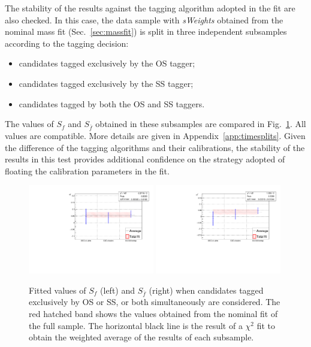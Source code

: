 The stability of the results against the tagging algorithm adopted in the fit are also checked. In this case, the data
sample with \emph{sWeights} obtained from the nominal mass fit (Sec.~\ref{sec:massfit}) is split in three independent subsamples
according to the tagging decision:
\begin{itemize}[noitemsep,topsep=0pt]
  \item candidates tagged exclusively by the OS tagger;
  \item candidates tagged exclusively by the SS tagger;
  \item candidates tagged by both the OS and SS taggers.
\end{itemize}
The values of $S_{f}$ and  $S_{\bar{f}}$ obtained in these subsamples are compared in Fig.~\ref{fig:tagging_splits}.
All values are compatible. More details are given in Appendix~\ref{app:timesplits}. Given the
difference of the tagging algorithms and their calibrations, the stability of the results in this test provides additional
confidence on the strategy adopted of floating the calibration parameters in the fit.

\begin{figure}[htpb]
        \begin{center}
                \includegraphics[width=0.49\textwidth]{05DecaytimeFit/figs/splits/Sf_splits_SSOSExclusive.pdf}
                \includegraphics[width=0.49\textwidth]{05DecaytimeFit/figs/splits/Sfbar_splits_SSOSExclusive.pdf}
        \end{center}
        \vspace{-2mm}
        \caption{Fitted values of $S_f$ (left) and $S_{\bar f}$ (right) when candidates tagged
        exclusively by OS or SS, or both simultaneously are considered. 
        The red hatched band shows the values obtained from the nominal fit of the full sample.
        The horizontal black line is the result of a $\chi^2$ fit to obtain the weighted average of the results of each subsample.}
        \label{fig:tagging_splits}
\end{figure}

